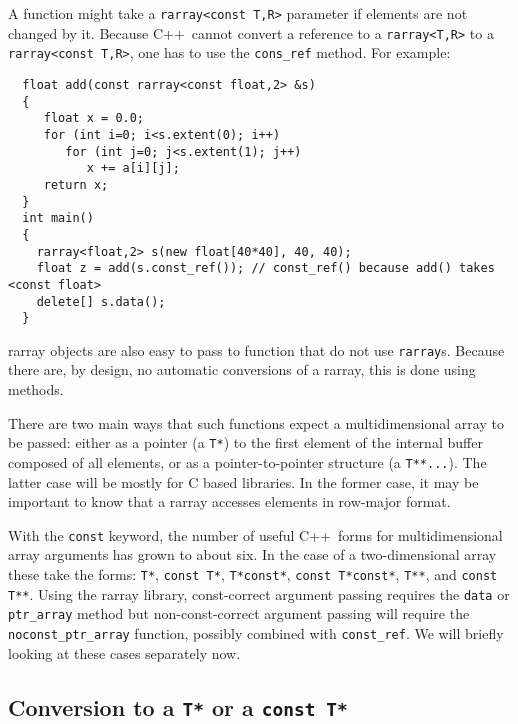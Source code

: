 \documentclass[12pt,twoside]{article}
\newcommand{\cxx}{C{++}}
\begin{document}
A function might take a \texttt{rarray{\tt<}const T,R{\tt>}} parameter if elements are not changed by it. Because \cxx\ cannot convert a reference to a \texttt{rarray{\tt<}T,R{\tt>}} to a \texttt{rarray{\tt<}const T,R{\tt>}}, one has to use the \texttt{cons\_ref} method.
For example:
\vspace{-5pt}\begin{framed}\vspace{-14pt}%
\begin{verbatim}
  float add(const rarray<const float,2> &s) 
  {
     float x = 0.0;
     for (int i=0; i<s.extent(0); i++)
        for (int j=0; j<s.extent(1); j++)
           x += a[i][j];
     return x;
  }
  int main() 
  {
    rarray<float,2> s(new float[40*40], 40, 40);
    float z = add(s.const_ref()); // const_ref() because add() takes <const float>
    delete[] s.data();
  }
\end{verbatim}
\vspace{-14pt}
\end{framed}\vspace{-8pt}

rarray objects are also easy to pass to function that do not use \texttt{rarray}s. Because there are, by design, no automatic conversions of a
rarray, this is done using methods.

There are two main ways that such functions expect a multidimensional
array to be passed: either as a pointer (a \texttt{T*}) to the first
element of the internal buffer composed of all elements, or as a
pointer-to-pointer structure (a \texttt{T**...}).  The latter case
will be mostly for C based libraries.  In the former case, it may be
important to know that a rarray accesses elements in row-major
format.

With the \texttt{const} keyword, the number of useful \cxx\ forms for multidimensional array arguments has grown to about six.  In the case of a two-dimensional array these take the forms:
 \texttt{T*}, \texttt{const T*}, \texttt{T*const*}, \texttt{const T*const*}, \texttt{T**}, and \texttt{const T**}.
Using the rarray library, const-correct argument passing requires the \texttt{data} or \texttt{ptr\_array} method but non-const-correct argument passing will require the \texttt{noconst\_ptr\_array} function, possibly combined with \texttt{const\_ref}.
We will briefly looking at these cases separately now.

\subsection{Conversion to a {\tt T*} or a {\tt const T*}}
\end{document}
